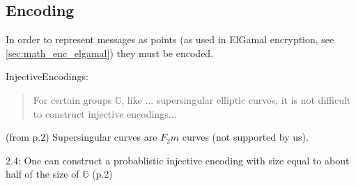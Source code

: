 \subsection{Encoding}

In order to represent messages as points (as used in ElGamal encryption, see \ref{sec:math_enc_elgamal}) they must be encoded.

InjectiveEncodings:

\begin{quote}
    For certain groups \(\mathbb{G}\), like ... supersingular elliptic curves, it is not difficult to construct injective
	encodings...
\end{quote}

(from p.2) Supersingular curves are \(F_2m\) curves (not supported by us).

2.4: One can construct a probablistic injective encoding with size equal to about half of the size of \(\mathbb{G}\) (p.2)